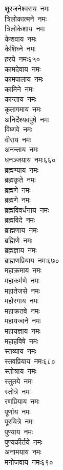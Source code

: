 \begin{multicols}{2}
\begin{flushleft}
शूरजनेश्वराय~नमः\\
त्रिलोकात्मने~नमः\\
त्रिलोकेशाय~नमः\\
केशवाय~नमः\\
केशिघ्ने~नमः\\
हरये~नमः\hfill ६५०\\
कामदेवाय~नमः\\
कामपालाय~नमः\\
कामिने~नमः\\
कान्ताय~नमः\\
कृतागमाय~नमः\\
अनिर्देश्यवपुषे~नमः\\
विष्णवे~नमः\\
वीराय~नमः\\
अनन्ताय~नमः\\
धनञ्जयाय~नमः\hfill ६६०\\
ब्रह्मण्याय~नमः\\
ब्रह्मकृते~नमः\\
ब्रह्मणे~नमः\\
ब्रह्मणे~नमः\\
ब्रह्मविवर्धनाय~नमः\\
ब्रह्मविदे~नमः\\
ब्राह्मणाय~नमः\\
ब्रह्मिणे~नमः\\
ब्रह्मज्ञाय~नमः\\
ब्राह्मणप्रियाय~नमः\hfill ६७०\\
महाक्रमाय~नमः\\
महाकर्मणे~नमः\\
महातेजसे~नमः\\
महोरगाय~नमः\\
महाक्रतवे~नमः\\
महायज्वने~नमः\\
महायज्ञाय~नमः\\
महाहविषे~नमः\\
स्तव्याय~नमः\\
स्तवप्रियाय~नमः\hfill ६८०\\
स्तोत्राय~नमः\\
स्तुतये~नमः\\
स्तोत्रे~नमः\\
रणप्रियाय~नमः\\
पूर्णाय~नमः\\
पूरयित्रे~नमः\\
पुण्याय~नमः\\
पुण्यकीर्तये~नमः\\
अनामयाय~नमः\\
मनोजवाय~नमः\hfill ६९०\\

\end{flushleft}
\end{multicols}
